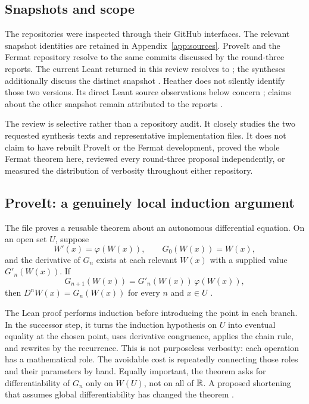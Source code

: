 \documentclass[11pt,letterpaper]{article}
\newcommand{\code}[1]{\texttt{\detokenize{#1}}}
\theoremstyle{definition}\newtheorem{definition}[theorem]{Definition}
\theoremstyle{remark}\newtheorem{remark}[theorem]{Remark}
\begin{document}
\subsection{Snapshots and scope}
The repositories were inspected through their GitHub interfaces. The relevant
snapshot identities are retained in Appendix~\ref{app:sources}. ProveIt and the
Fermat repository resolve to the same commits discussed by the round-three
reports. The current Leant \code{main} returned in this review resolves to
\code{3a40904b}; the syntheses additionally discuss the distinct snapshot
\code{823259f7}. Heather does not silently identify those two versions. Its direct
Leant source observations below concern \code{3a40904b}; claims about the other
snapshot remain attributed to the reports \cite{leant-verification,leant-adapter,
round3a,round3b}.

The review is selective rather than a repository audit. It closely studies the
two requested synthesis texts and representative implementation files. It does
not claim to have rebuilt ProveIt or the Fermat development, proved the whole
Fermat theorem here, reviewed every round-three proposal independently, or
measured the distribution of verbosity throughout either repository.

\subsection{ProveIt: a genuinely local induction argument}
The file  proves a reusable theorem about
an autonomous differential equation. On an open set $U$, suppose
\[
 W'(x)=\varphi(W(x)),\qquad G_0(W(x))=W(x),
\]
and the derivative of $G_n$ exists at each relevant $W(x)$ with a supplied
value $G'_n(W(x))$. If
\[
 G_{n+1}(W(x))=G'_n(W(x))\,\varphi(W(x)),
\]
then $D^nW(x)=G_n(W(x))$ for every $n$ and $x\in U$
\cite{autonomous}.

The Lean proof performs induction before introducing the point in each branch.
In the successor step, it turns the induction hypothesis on $U$ into eventual
equality at the chosen point, uses derivative congruence, applies the chain
rule, and rewrites by the recurrence. This is not purposeless verbosity: each
operation has a mathematical role. The avoidable cost is repeatedly connecting
those roles and their parameters by hand. Equally important, the theorem asks
for differentiability of $G_n$ only on $W(U)$, not on all of $\mathbb R$. A proposed
shortening that assumes global differentiability has changed the theorem
\cite{autonomous}.
\end{document}
